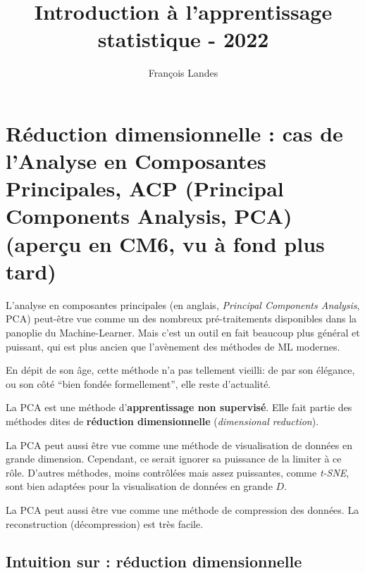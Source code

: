 \documentclass[french,twoside]{article}
\title{Introduction à l'apprentissage statistique - 2022}
\author{François Landes}
\begin{document}
\maketitle


\tableofcontents

\section{Réduction dimensionnelle : cas de l'Analyse en Composantes Principales, ACP (Principal Components Analysis, PCA) (aperçu en CM6, vu à fond plus tard)}

L'analyse en composantes principales (en anglais,  \textit{Principal Components Analysis}, PCA) peut-être vue comme un des nombreux pré-traitements disponibles dans la panoplie du Machine-Learner. Mais c'est un outil en fait beaucoup plus général et puissant, qui est plus ancien que l'avènement des méthodes de ML modernes.

En dépit de son âge, cette méthode n'a pas tellement vieilli: de par son élégance, ou son côté ``bien fondée formellement'', elle reste d'actualité.

La PCA est une méthode d'\textbf{apprentissage non supervisé}. Elle fait partie des méthodes dites de \textbf{réduction dimensionnelle} (\textit{dimensional reduction}).

La PCA peut aussi être vue comme une méthode de visualisation de données en grande dimension. Cependant, ce serait ignorer sa puissance de la limiter à ce rôle. D'autres méthodes, moins contrôlées mais assez puissantes, comme \textit{t-SNE}, sont bien adaptées pour la visualisation de données en grande $D$.

La PCA peut aussi être vue comme une méthode de compression des données. La reconstruction (décompression) est très facile.

\subsection{Intuition sur : réduction dimensionnelle}
\end{document}
